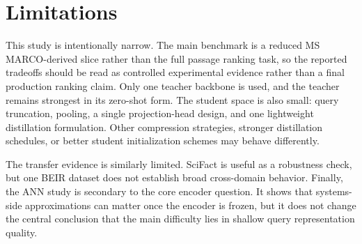 \section{Limitations}

This study is intentionally narrow. The main benchmark is a reduced MS MARCO-derived slice rather than the full passage ranking task, so the reported tradeoffs should be read as controlled experimental evidence rather than a final production ranking claim. Only one teacher backbone is used, and the teacher remains strongest in its zero-shot form. The student space is also small: query truncation, pooling, a single projection-head design, and one lightweight distillation formulation. Other compression strategies, stronger distillation schedules, or better student initialization schemes may behave differently.

The transfer evidence is similarly limited. SciFact is useful as a robustness check, but one BEIR dataset does not establish broad cross-domain behavior. Finally, the ANN study is secondary to the core encoder question. It shows that systems-side approximations can matter once the encoder is frozen, but it does not change the central conclusion that the main difficulty lies in shallow query representation quality.
